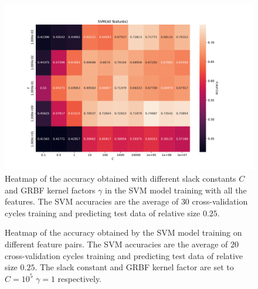\begin{figure}[H]
\centering
\includegraphics[width=1\textwidth]{Figures/accuracy(C,gamma)0}
\caption{Heatmap of the accuracy obtained with different slack constants $C$ and 
GRBF kernel factors $\gamma $ in the SVM model training with all the features. The SVM accuracies are the average of $30$ cross-validation 
cycles training and predicting test data of relative size $0.25$.}
\label{fig:Figures-accuracy-C-gamma-0}
\end{figure}

\begin{figure}[H]
\centering
{}
\caption{Heatmap of the accuracy obtained by the SVM model training on different feature pairs. The SVM accuracies are the average 
of $20$ cross-validation cycles training and predicting test data of relative size $0.25$.
The slack constant and GRBF kernel factor are set to $C=10^5$  $\gamma=1 $ respectively. }
\label{fig:Figures-feature_pairs0}
\end{figure}

